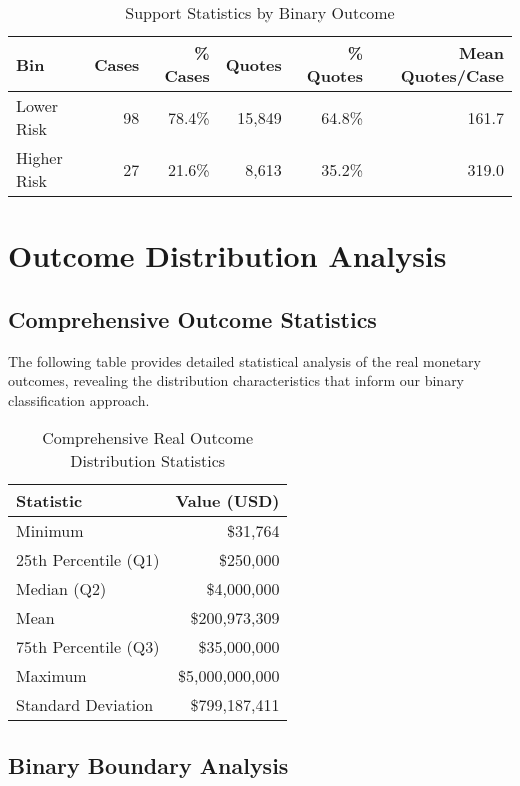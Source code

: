 \documentclass[11pt,a4paper]{article}
\begin{document}
\begin{table}[H]
\centering
\caption{Support Statistics by Binary Outcome}
\begin{tabular}{lrrrrr}
\toprule
\textbf{Bin} & \textbf{Cases} & \textbf{\% Cases} & \textbf{Quotes} & \textbf{\% Quotes} & \textbf{Mean Quotes/Case} \\
\midrule
Lower Risk & 98 & 78.4\% & 15,849 & 64.8\% & 161.7 \\
Higher Risk & 27 & 21.6\% & 8,613 & 35.2\% & 319.0 \\
\bottomrule
\end{tabular}
\end{table}

\section{Outcome Distribution Analysis}

\subsection{Comprehensive Outcome Statistics}

The following table provides detailed statistical analysis of the real monetary outcomes, revealing the distribution characteristics that inform our binary classification approach.

\begin{table}[H]
\centering
\caption{Comprehensive Real Outcome Distribution Statistics}
\begin{tabular}{lr}
\toprule
\textbf{Statistic} & \textbf{Value (USD)} \\
\midrule
Minimum & \$31,764 \\
25th Percentile (Q1) & \$250,000 \\
Median (Q2) & \$4,000,000 \\
Mean & \$200,973,309 \\
75th Percentile (Q3) & \$35,000,000 \\
Maximum & \$5,000,000,000 \\
\midrule
Standard Deviation & \$799,187,411 \\
\bottomrule
\end{tabular}
\end{table}

\subsection{Binary Boundary Analysis}
\end{document}
